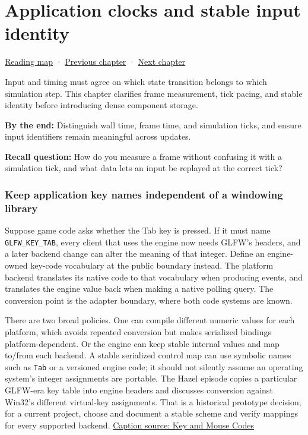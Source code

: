 \hypertarget{05-engine-i-ch014}{}
\chapter{Application clocks and stable input identity}\label{05-engine-i-ch014-application-clocks-and-stable-input-identity}

\hyperref[volume-reading-map]{Reading map} · \hyperref[05-engine-i-ch013-portable-startup-windows-events-and-input]{Previous chapter} · \hyperref[05-engine-i-ch015-sparse-set-components-and-generational-entity-handles]{Next chapter}

Input and timing must agree on which state transition belongs to which simulation step. This chapter clarifies frame measurement, tick pacing, and stable identity before introducing dense component storage.

\textbf{By the end:} Distinguish wall time, frame time, and simulation ticks, and ensure input identifiers remain meaningful across updates.

\textbf{Recall question:} How do you measure a frame without confusing it with a simulation tick, and what data lets an input be replayed at the correct tick?

\subsection{Keep application key names independent of a windowing library}\label{05-engine-i-ch014-keep-application-key-names-independent-of-a-windowing-library}

Suppose game code asks whether the Tab key is pressed. If it must name \texttt{GLFW\_KEY\_TAB}, every client that uses the engine now needs GLFW's headers, and a later backend change can alter the meaning of that integer. Define an engine-owned key-code vocabulary at the public boundary instead. The platform backend translates its native code to that vocabulary when producing events, and translates the engine value back when making a native polling query. The conversion point is the adapter boundary, where both code systems are known.

There are two broad policies. One can compile different numeric values for each platform, which avoids repeated conversion but makes serialized bindings platform-dependent. Or the engine can keep stable internal values and map to/from each backend. A stable serialized control map can use symbolic names such as \texttt{Tab} or a versioned engine code; it should not silently assume an operating system's integer assignments are portable. The Hazel episode copies a particular GLFW-era key table into engine headers and discusses conversion against Win32's different virtual-key assignments. That is a historical prototype decision; for a current project, choose and document a stable scheme and verify mappings for every supported backend. \href{https://www.youtube.com/watch?v=zaJGn8pur5I}{Caption source: Key and Mouse Codes}

